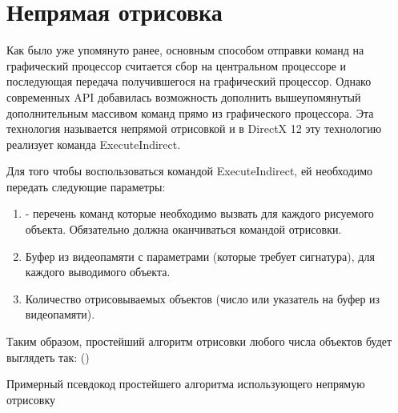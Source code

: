 \section{Непрямая отрисовка} \label{ch3:indirect_draw}
Как было уже упомянуто ранее, основным способом отправки команд на графический процессор считается сбор  на центральном процессоре и последующая передача получившегося  на графический процессор. Однако современных API добавилась возможность дополнить вышеупомянутый  дополнительным массивом команд прямо из графического процессора. Эта технология называется непрямой отрисовкой и в DirectX 12 эту технологию реализует команда ExecuteIndirect. 

Для того чтобы воспользоваться командой ExecuteIndirect, ей необходимо передать следующие параметры:
\begin{enumerate}[1.] 
	\item {} - перечень команд которые необходимо вызвать для каждого рисуемого объекта. Обязательно должна оканчиваться командой отрисовки.
	\item Буфер из видеопамяти с параметрами (которые требует сигнатура), для каждого выводимого объекта.
	\item Количество отрисовываемых объектов (число или указатель на буфер из видеопамяти).
\end{enumerate}

Таким образом, простейший алгоритм отрисовки любого числа объектов будет выглядеть так: ()

\begin{algorithm} %
	\nonl{}
	\caption{Примерный псевдокод простейшего алгоритма использующего непрямую отрисовку}\label{alg:simpleIndirect}
\end{algorithm}
\FloatBarrier

